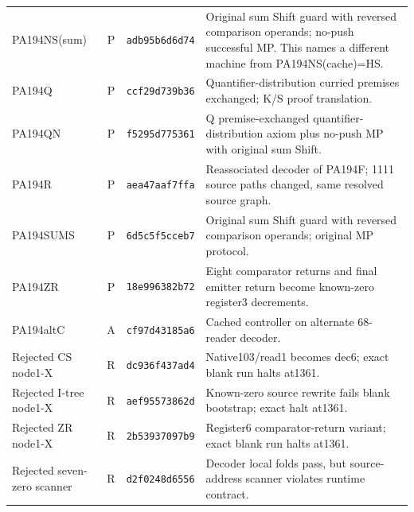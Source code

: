 \begin{longtable}{@{}>{\raggedright\arraybackslash}p{}cp{}>{\raggedright\arraybackslash}p{}@{}}
PA194NS(sum) & P & \texttt{adb95b6d6d74} & Original sum Shift guard with reversed comparison operands; no-push successful MP. This names a different machine from PA194NS(cache)=HS.\\[3pt]
PA194Q & P & \texttt{ccf29d739b36} & Quantifier-distribution curried premises exchanged; K/S proof translation.\\[3pt]
PA194QN & P & \texttt{f5295d775361} & Q premise-exchanged quantifier-distribution axiom plus no-push MP with original sum Shift.\\[3pt]
PA194R & P & \texttt{aea47aaf7ffa} & Reassociated decoder of PA194F; 1111 source paths changed, same resolved source graph.\\[3pt]
PA194SUMS & P & \texttt{6d5c5f5cceb7} & Original sum Shift guard with reversed comparison operands; original MP protocol.\\[3pt]
PA194ZR & P & \texttt{18e996382b72} & Eight comparator returns and final emitter return become known-zero register3 decrements.\\[3pt]
PA194altC & A & \texttt{cf97d43185a6} & Cached controller on alternate 68-reader decoder.\\[3pt]
Rejected CS node1-X & R & \texttt{dc936f437ad4} & Native103/read1 becomes dec6; exact blank run halts at1361.\\[3pt]
Rejected I-tree node1-X & R & \texttt{aef95573862d} & Known-zero source rewrite fails blank bootstrap; exact halt at1361.\\[3pt]
Rejected ZR node1-X & R & \texttt{2b53937097b9} & Register6 comparator-return variant; exact blank run halts at1361.\\[3pt]
Rejected seven-zero scanner & R & \texttt{d2f0248d6556} & Decoder local folds pass, but source-address scanner violates runtime contract.\\[3pt]
\bottomrule\end{longtable}
\normalsize
